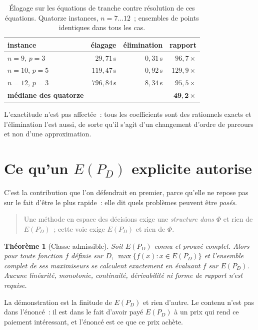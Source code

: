 \documentclass[12pt,a4paper]{report}
\newcommand{\Dset}{D}
\newcommand{\E}{E(P_D)}
\theoremstyle{plain}
\newtheorem{theoreme}{Théorème}[chapter]
\theoremstyle{definition}
\begin{document}
\begin{table}[h]
\centering
\caption{Élagage sur les équations de tranche contre résolution de ces
équations.  Quatorze instances, $n = 7 \dots 12$~; ensembles de points
identiques dans tous les cas.}
\begin{tabular}{lrrr}
\toprule
instance & élagage & élimination & rapport \\
\midrule
$n=9$, $p=3$  & $29{,}71$\,s  & $0{,}31$\,s & $96{,}7\times$ \\
$n=10$, $p=5$ & $119{,}47$\,s & $0{,}92$\,s & $129{,}9\times$ \\
$n=12$, $p=3$ & $796{,}84$\,s & $8{,}34$\,s & $95{,}5\times$ \\
\midrule
\textbf{médiane des quatorze} & & & $\mathbf{49{,}2\times}$ \\
\bottomrule
\end{tabular}
\end{table}

\noindent
L'exactitude n'est pas affectée~: tous les coefficients sont des rationnels
exacts et l'élimination l'est aussi, de sorte qu'il s'agit d'un changement
d'ordre de parcours et non d'une approximation.

\section{Ce qu'un \texorpdfstring{$\E$}{E(P\_D)} explicite autorise}
\label{sec:admissible}

C'est la contribution que l'on défendrait en premier, parce qu'elle ne repose
pas sur le fait d'être le plus rapide~: elle dit quels problèmes peuvent être
\emph{posés}.

\begin{quote}
Une méthode en espace des décisions exige une \emph{structure dans $\Phi$} et
rien de $\E$~; cette voie exige \emph{$\E$} et rien de $\Phi$.
\end{quote}

\begin{theoreme}[Classe admissible]\label{th:admissible}
Soit $\E$ connu et prouvé complet.  Alors pour \emph{toute} fonction $f$
définie sur $\Dset$, $\max\{f(x) : x \in \E\}$ et l'ensemble complet de ses
maximiseurs se calculent exactement en évaluant $f$ sur $\E$.  Aucune
linéarité, monotonie, continuité, dérivabilité ni forme de rapport n'est
requise.
\end{theoreme}

\noindent
La démonstration est la finitude de $\E$ et rien d'autre.  Le contenu n'est pas
dans l'énoncé~: il est dans le fait d'avoir payé $\E$ à un prix qui rend ce
paiement intéressant, et l'énoncé est ce que ce prix achète.
\end{document}
